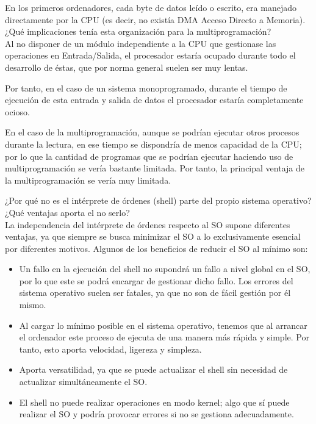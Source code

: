 \begin{ejercicio}\label{ej:2.Ejercicio10}
    En los primeros ordenadores, cada byte de datos leído o escrito, era manejado directamente por la CPU (es decir, no existía DMA Acceso Directo a Memoria). ¿Qué implicaciones tenía esta organización para la multiprogramación? \\

    Al no disponer de un módulo independiente a la CPU que gestionase las operaciones en Entrada/Salida, el procesador estaría ocupado durante todo el desarrollo de éstas, que por norma general suelen ser muy lentas.
    
    Por tanto, en el caso de un sistema monoprogramado, durante el tiempo de ejecución de esta entrada y salida de datos el procesador estaría completamente ocioso.

    En el caso de la multiprogramación, aunque se podrían ejecutar otros procesos durante la lectura, en ese tiempo se dispondría de menos capacidad de la CPU; por lo que la cantidad de programas que se podrían ejecutar haciendo uso de multiprogramación se vería bastante limitada. Por tanto, la principal ventaja de la multiprogramación se vería muy limitada.
    
\end{ejercicio}

\begin{ejercicio}\label{ej:2.Ejercicio11}
    ¿Por qué no es el intérprete de órdenes (shell) parte del propio sistema operativo? ¿Qué ventajas aporta el no serlo?\\
    
    La independencia del intérprete de órdenes respecto al SO supone diferentes ventajas, ya que siempre se busca minimizar el SO a lo exclusivamente esencial por diferentes motivos. Algunos de los beneficios de reducir el SO al mínimo son:
    \begin{itemize}
        \item Un fallo en la ejecución del shell no supondrá un fallo a nivel global en el SO, por lo que este se podrá encargar de gestionar dicho fallo. Los errores del sistema operativo suelen ser fatales, ya que no son de fácil gestión por él mismo.

        \item Al cargar lo mínimo posible en el sistema operativo, tenemos que al arrancar el ordenador este proceso de ejecuta de una manera más rápida y simple. Por tanto, esto aporta velocidad, ligereza y simpleza.

        \item Aporta versatilidad, ya que se puede actualizar el shell sin necesidad de actualizar simultáneamente el SO.

        \item El shell no puede realizar operaciones en modo kernel; algo que sí puede realizar el SO y podría provocar errores si no se gestiona adecuadamente.
    \end{itemize}    
\end{ejercicio}

